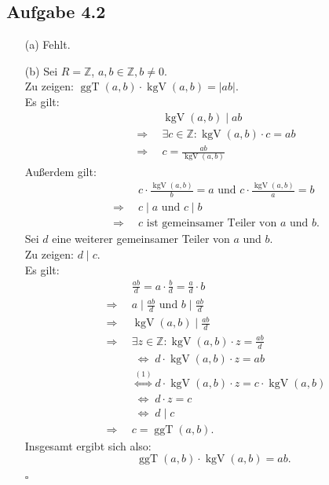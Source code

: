 \documentclass[12pt]{article}
\newcommand{\QED}{\begin{flushright} $\square$ \end{flushright}}
\newcommand{\df}{\enspace\Longrightarrow\enspace}
\newcommand{\gdw}{\;\Longleftrightarrow\;}
\newcommand{\abs}[1]{\vert #1\vert}
\newcommand{\ggT}{\operatorname{ggT}}
\newcommand{\kgV}{\operatorname{kgV}}
\begin{document}
\subsection*{Aufgabe 4.2}
\begin{enumerate}
	\item[(a)] Fehlt.
	
	\item[(b)] Sei $R=\mathbb{Z}$, $a,b\in\mathbb{Z},b\neq 0$. \\
	Zu zeigen: $\ggT(a,b)\cdot\kgV(a,b)=\abs{ab}$. \\
	Es gilt:
	\begin{align}
		&\kgV(a,b)\mid ab \nonumber\\
		\df &\exists c\in\mathbb{Z}:\kgV(a,b)\cdot c=ab \nonumber \\
		\df &c=\frac{ab}{\kgV(a,b)}
	\end{align}
	Außerdem gilt:
	\begin{align*}
		&c\cdot \frac{\kgV(a,b)}{b}=a\text{ und }c\cdot \frac{\kgV(a,b)}{a}=b \\
		\df &c\mid a\text{ und }c\mid b \\
		\df &c\text{ ist gemeinsamer Teiler von $a$ und $b$}.
	\end{align*}
	Sei $d$ eine weiterer gemeinsamer Teiler von $a$ und $b$. \\
	Zu zeigen: $d\mid c$. \\
	Es gilt:
	\begin{align*}
		&\frac{ab}{d}=a\cdot\frac{b}{d}=\frac{a}{d}\cdot b \\
		\df &a\mid\frac{ab}{d}\text{ und }b\mid\frac{ab}{d} \\
		\df &\kgV(a,b)\mid\frac{ab}{d} \\
		\df &\exists z\in\mathbb{Z}:\kgV(a,b)\cdot z=\frac{ab}{d} \\
		&\gdw d\cdot\kgV(a,b)\cdot z=ab \\
		&\overset{(1)}{\gdw} d\cdot\kgV(a,b)\cdot z=c\cdot\kgV(a,b) \\
		&\gdw d\cdot z=c \\
		&\gdw d\mid c \\
		\df &c=\ggT(a,b).
	\end{align*}
	Insgesamt ergibt sich also: $$\ggT(a,b)\cdot\kgV(a,b)=ab.$$
	\QED
\end{enumerate}
\end{document}
